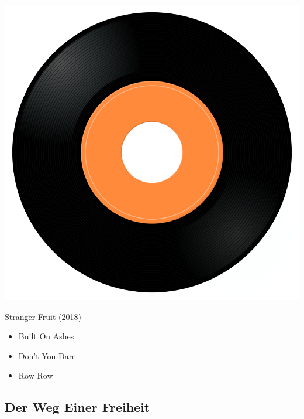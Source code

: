 \begin{minipage}[t]{0.25\textwidth}
\captionsetup{type=figure}
\includegraphics[width=\textwidth]{Images/cover.png}
\caption*{Stranger Fruit (2018)}
\end{minipage}
\begin{minipage}[t]{0.25\textwidth}\vspace{0pt}
\begin{itemize}[nosep,leftmargin=1em,labelwidth=*,align=left]
	\setlength{\itemsep}{0pt}
	\item Built On Ashes
	\item Don't You Dare
	\item Row Row
\end{itemize}
\end{minipage}

\subsection{Der Weg Einer Freiheit}

